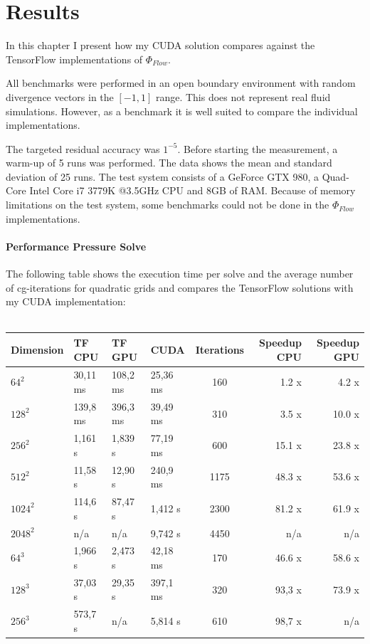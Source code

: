 \chapter{Results}\label{chapter:results}

In this chapter I present how my CUDA solution compares against the TensorFlow implementations of $\Phi_{Flow}$.
\par All benchmarks were performed in an open boundary environment with random divergence vectors in the $\left[-1, 1 \right]$ range. This does not represent real fluid simulations. However, as a benchmark it is well suited to compare the individual implementations. 
\par The targeted residual accuracy was $1^{-5}$. Before starting the measurement, a warm-up of 5 runs was performed. The data shows the mean and standard deviation of 25 runs. The test system consists of a GeForce GTX 980, a Quad-Core Intel Core i7 3779K @3.5GHz CPU and 8GB of RAM. Because of memory limitations on the test system, some benchmarks could not be done in the $\Phi_{Flow}$ implementations.
\subsubsection{Performance Pressure Solve}
The following table shows the execution time per solve and the average number of cg-iterations for quadratic grids and compares the TensorFlow solutions with my CUDA implementation: \\\\
\renewcommand{\arraystretch}{1.6}
\small
\begin{tabular}{l||l|l|l||c||r|r}
\hline
Dimension & TF CPU   & TF GPU   & CUDA     & Iterations & Speedup CPU & Speedup GPU \\ \hline
$64^2$   & 30,11 ms & 108,2 ms & 25,36 ms & 160  & 1.2 x  & 4.2 x  \\ \hline
$128^2$  & 139,8 ms & 396,3 ms & 39,49 ms & 310  & 3.5 x  & 10.0 x \\ \hline
$256^2$  & 1,161 s  & 1,839 s  & 77,19 ms & 600  & 15.1 x & 23.8 x \\ \hline
$512^2$  & 11,58 s  & 12,90 s  & 240,9 ms & 1175 & 48.3 x & 53.6 x \\ \hline
$1024^2$ & 114,6 s  & 87,47 s  & 1,412 s  & 2300 & 81.2 x & 61.9 x \\ \hline
$2048^2$ & n/a      & n/a      & 9,742 s  & 4450 & n/a    & n/a    \\ \hline \hline

$64^3$   & 1,966 s  & 2,473 s  & 42,18 ms & 170  & 46.6 x & 58.6 x \\ \hline
$128^3$  & 37,03 s  & 29,35 s  & 397,1 ms & 320  & 93,3 x & 73.9 x \\ \hline
$256^3$  & 573,7 s  & n/a      & 5,814 s  & 610  & 98,7 x & n/a 		  \\ \hline
\end{tabular}
\normalsize

